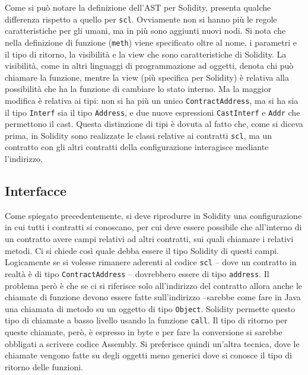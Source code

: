 \documentclass[]{article}
\begin{document}
Come si può notare la definizione dell'AST per Solidity, presenta
qualche differenza rispetto a quello per \texttt{scl}. Ovviamente non si
hanno più le regole caratteristiche per gli umani, ma in più sono
aggiunti nuovi nodi. Si nota che nella definizione di funzione
(\texttt{meth}) viene specificato oltre al nome, i parametri e il tipo
di ritorno, la visibilità e la view che sono caratteristiche di
Solidity. La visibilità, come in altri linguaggi di programmazione ad
oggetti, denota chi può chiamare la funzione, mentre la view (più
specifica per Solidity) è relativa alla possibilità che ha la funzione
di cambiare lo stato interno. Ma la maggior modifica è relativa ai tipi:
non si ha più un unico \texttt{ContractAddress}, ma si ha sia il tipo
\texttt{Interf} sia il tipo \texttt{Address}, e due nuove espressioni
\texttt{CastInterf} e \texttt{Addr} che permettono il cast. Questa
distinzione di tipi è dovuta al fatto che, come si diceva prima, in
Solidity sono realizzate le classi relative ai contratti \texttt{scl},
ma un contratto con gli altri contratti della configurazione interagisce
mediante l'indirizzo.

\hypertarget{interfacce}{%
\subsection{Interfacce}\label{interfacce}}

Come spiegato precedentemente, si deve riprodurre in Solidity una
configurazione in cui tutti i contratti si conoscano, per cui deve
essere possibile che all'interno di un contratto avere campi relativi ad
altri contratti, sui quali chiamare i relativi metodi. Ci si chiede così
quale debba essere il tipo Solidity di questi campi. Logicamente se si
volesse rimanere aderenti al codice \texttt{scl} -- dove un contratto in
realtà è di tipo \texttt{ContractAddress} -- dovrebbero essere di tipo
\texttt{address}. Il problema però è che se ci si riferisce solo
all'indirizzo del contratto allora anche le chiamate di funzione devono
essere fatte sull'indirizzo --sarebbe come fare in Java una chiamata di
metodo su un oggetto di tipo \texttt{Object}. Solidity permette questo
tipo di chiamate a basso livello usando la funzione \texttt{call}. Il
tipo di ritorno per queste chiamate, però, è espresso in byte e per fare
la conversione si sarebbe obbligati a scrivere codice Assembly. Si
preferisce quindi un'altra tecnica, dove le chiamate vengono fatte su
degli oggetti meno generici dove si conosce il tipo di ritorno delle
funzioni.
\end{document}
